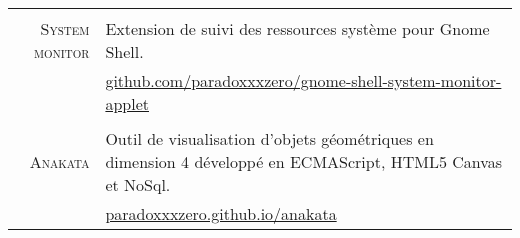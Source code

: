 \documentclass[a4paper,10pt]{article}
\begin{document}
\begin{tabular}{r|p{11cm}}
    \multicolumn{2}{c}{} \\
    \textsc{System monitor}
      & Extension de suivi des ressources système pour Gnome Shell. \\
      & \href{https://github.com/paradoxxxzero/gnome-shell-system-monitor-applet}{github.com/paradoxxxzero/gnome-shell-system-monitor-applet} \\

    \multicolumn{2}{c}{} \\
    \textsc{Anakata}
      & Outil de visualisation d’objets géométriques en dimension 4 développé en ECMAScript, HTML5 Canvas et NoSql. \\
      & \href{http://paradoxxxzero.github.io/anakata/}{paradoxxxzero.github.io/anakata} \\
  \end{tabular}
\end{document}
